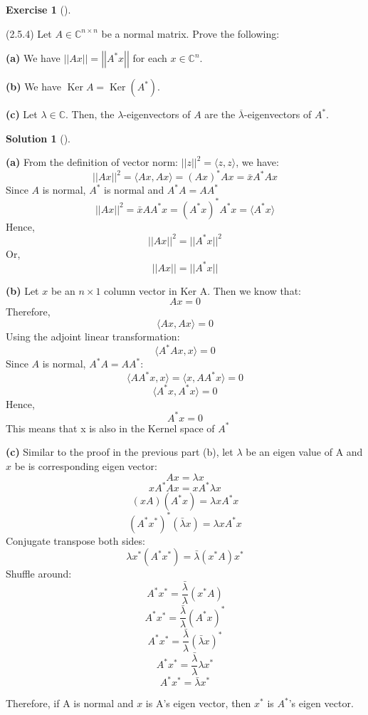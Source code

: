 \documentclass[numbers=enddot,12pt,final,onecolumn,notitlepage]{scrartcl}
\newcounter{exer}
\newcounter{sol}
\theoremstyle{definition}
\newtheorem{exmp}[exer]{Exercise}
\newenvironment{exercise}[1][]
{\begin{exmp}[#1]\begin{leftbar}}
        {\end{leftbar}\end{exmp}}
\newtheorem{solu}[sol]{Solution}
\newenvironment{solution}[1][]
{\begin{solu}[#1]\begin{leftbar}}
        {\end{leftbar}\end{solu}}
\begin{document}
\begin{exercise}
	\label{exe.schurtri.normal.A*x} (2.5.4) Let $A\in\mathbb{C}^{n\times n}$ be a
	normal matrix. Prove the following: \medskip

	\textbf{(a)} We have $\left\vert \left\vert Ax\right\vert \right\vert
		=\left\vert \left\vert A^{\ast}x\right\vert \right\vert $ for each
	$x\in\mathbb{C}^{n}$. \medskip

	\textbf{(b)} We have $\operatorname*{Ker}A=\operatorname*{Ker}\left(  A^{\ast
		}\right)  $. \medskip

	\textbf{(c)} Let $\lambda\in\mathbb{C}$. Then, the $\lambda$-eigenvectors of
	$A$ are the $\overline{\lambda}$-eigenvectors of $A^{\ast}$.
\end{exercise}

\begin{solution}
	\textbf{(a)} From the definition of vector norm: $\vert\vert z \vert\vert^2 = \langle z, z\rangle$, we have:
	\[
		\vert\vert Ax \vert\vert^2 = \langle Ax, Ax\rangle = (Ax)^{\ast}Ax = \bar{x}A^{\ast}Ax
	\]
	Since $A$ is normal, $A^{\ast}$ is normal and $A^{\ast}A = AA^{\ast}$
	\[
		\vert\vert Ax \vert\vert^2 = \bar{x}AA^{\ast}x = (A^{\ast}x)^{\ast}A^{\ast}x = \langle A^{\ast}x \rangle
	\]
	Hence,
	\[
		\vert\vert Ax \vert\vert^2 = \vert\vert A^{\ast}x \vert\vert^2
	\]
	Or,
	\[
		\vert\vert Ax \vert\vert = \vert\vert A^{\ast}x \vert\vert
	\]

	\textbf{(b)} Let $x$ be an $n \times 1$ column vector in Ker A. Then we know that:
	\[
		Ax = 0
	\]
	Therefore,
	\[
		\langle Ax, Ax \rangle = 0
	\]
	Using the adjoint linear transformation:
	\[
		\langle A^{\ast}Ax, x \rangle = 0
	\]
	Since $A$ is normal, $A^{\ast}A = AA^{\ast}$:
	\[
		\langle AA^{\ast}x, x \rangle = \langle x, AA^{\ast}x \rangle = 0
	\]
	\[
		\langle A^{\ast}x, A^{\ast}x \rangle = 0
	\]
	Hence,
	\[
		A^{\ast}x = 0
	\]
	This means that x is also in the Kernel space of $A^{\ast}$

	\textbf{(c)} Similar to the proof in the previous part (b), let $ \lambda $ be an eigen value of A and $ x $ be is corresponding eigen vector:
	\[
		Ax = \lambda x
	\]
	\[
		xA^{\ast}Ax = xA^{\ast}\lambda x
	\]
	\[
		(xA)(A^{\ast}x) = \lambda xA^{\ast} x
	\]
	\[
		(A^{\ast}x^{\ast})^{\ast} (\bar{\lambda}x) = \lambda xA^{\ast} x
	\]
	Conjugate transpose both sides:
	\[
		\lambda x^{\ast} (A^{\ast}x^{\ast}) = \bar{\lambda} (x^{\ast} A) x^{\ast}
	\]
	Shuffle around:
	\[
		A^{\ast}x^{\ast} = \frac{\bar{\lambda}}{\lambda} (x^{\ast} A)
	\]
	\[
		A^{\ast}x^{\ast} = \frac{\bar{\lambda}}{\lambda} (A^{\ast}x)^{\ast}
	\]
	\[
		A^{\ast}x^{\ast} = \frac{\bar{\lambda}}{\lambda} (\bar{\lambda}x)^{\ast}
	\]
	\[
		A^{\ast}x^{\ast} = \frac{\bar{\lambda}}{\lambda} \lambda x^{\ast}
	\]
	\[
		A^{\ast}x^{\ast} = \bar{\lambda} x^{\ast}
	\]

	Therefore, if A is normal and $x$ is A's eigen vector, then $x^{\ast}$ is $A^{\ast}$'s eigen vector.

\end{solution}
\end{document}
